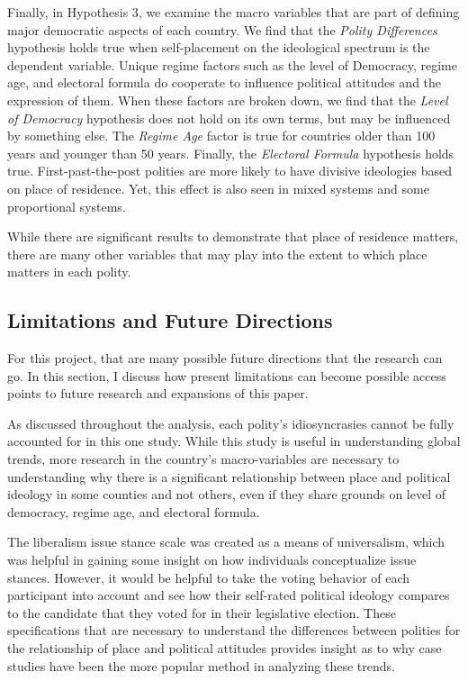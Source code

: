 \documentclass[12pt, titlepage]{article}
\newcommand\e{\emph}
\begin{document}
Finally, in Hypothesis 3, we examine the macro variables that are part of defining major democratic aspects of each country. We find that the \e{Polity Differences} hypothesis holds true when self-placement on the ideological spectrum is the dependent variable. Unique regime factors such as the level of Democracy, regime age, and electoral formula do cooperate to influence political attitudes and the expression of them. When these factors are broken down, we find that the \e{Level of Democracy} hypothesis does not hold on its own terms, but may be influenced by something else. The \e{Regime Age} factor is true for countries older than 100 years and younger than 50 years. Finally, the \e{Electoral Formula} hypothesis holds true. First-past-the-post polities are more likely to have divisive ideologies based on place of residence. Yet, this effect is also seen in mixed systems and some proportional systems.

While there are significant results to demonstrate that place of residence matters, there are many other variables that may play into the extent to which place matters in each polity.

\subsection{Limitations and Future Directions}

For this project, that are many possible future directions that the research can go. In this section, I discuss how present limitations can become possible access points to future research and expansions of this paper.

As discussed throughout the analysis, each polity's idiosyncrasies cannot be fully accounted for in this one study. While this study is useful in understanding global trends, more research in the country's macro-variables are necessary to understanding why there is a significant relationship between place and political ideology in some counties and not others, even if they share grounds on level of democracy, regime age, and electoral formula.

The liberalism issue stance scale was created as a means of universalism, which was helpful in gaining some insight on how individuals conceptualize issue stances. However, it would be helpful to take the voting behavior of each participant into account and see how their self-rated political ideology compares to the candidate that they voted for in their legislative election. These specifications that are necessary to understand the differences between polities for the relationship of place and political attitudes provides insight as to why case studies have been the more popular method in analyzing these trends. 
\end{document}
